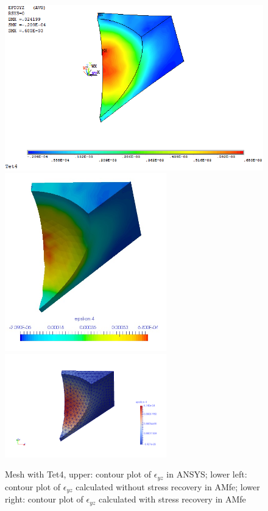 \begin{figure}[htbp]
	\begin{center}
		\includegraphics[width=13cm,clip]{Tet4Eyz.png} 	
		\includegraphics[width=7cm,clip]{Tet4EyzPD.png} 			
		\includegraphics[width=7cm,clip]{Tet4EyzP.png} 		
		\caption{Mesh with Tet4, upper: contour plot of $\epsilon_{yz}$ in ANSYS; lower left: contour plot of $\epsilon_{yz}$ calculated without stress recovery in AMfe; lower right: contour plot of $\epsilon_{yz}$ calculated with stress recovery in AMfe} \label{fig: Tet4_Eyz}
	\end{center}
\end{figure}
\clearpage 

